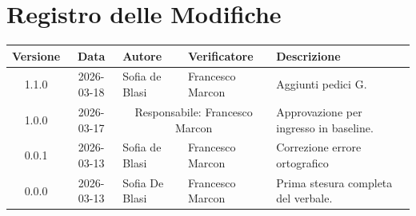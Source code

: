 \section*{Registro delle Modifiche}
\begin{table}[ht]
	\centering
	\renewcommand{\arraystretch}{1.5}
	\begin{tabularx}{\textwidth}{c c l l X}
		\toprule
		\textbf{Versione} & \textbf{Data} & \textbf{Autore} & \textbf{Verificatore} & \textbf{Descrizione} \\
		\midrule
		1.1.0 & 2026-03-18 & Sofia de Blasi & Francesco Marcon & Aggiunti pedici G. \\
        1.0.0 & 2026-03-17 & \multicolumn{2}{c}{Responsabile: Francesco Marcon} & Approvazione per ingresso in baseline. \\
		0.0.1 & 2026-03-13 & Sofia de Blasi & Francesco Marcon & Correzione errore ortografico \\
		0.0.0 & 2026-03-13 & Sofia De Blasi & Francesco Marcon & Prima stesura completa del verbale. \\
		\bottomrule
	\end{tabularx}
\end{table}